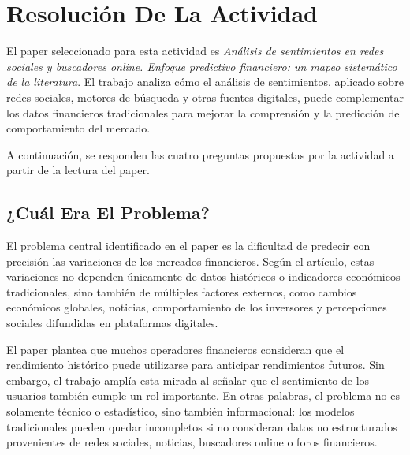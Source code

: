 
\section{Resolución De La Actividad}
\vspace{2mm}

El paper seleccionado para esta actividad es \textit{Análisis de sentimientos en redes sociales y buscadores online. Enfoque predictivo financiero: un mapeo sistemático de la literatura}. El trabajo analiza cómo el análisis de sentimientos, aplicado sobre redes sociales, motores de búsqueda y otras fuentes digitales, puede complementar los datos financieros tradicionales para mejorar la comprensión y la predicción del comportamiento del mercado.

\vspace{2mm}

A continuación, se responden las cuatro preguntas propuestas por la actividad a partir de la lectura del paper.


\subsection{¿Cuál Era El Problema?}
\vspace{2mm}

El problema central identificado en el paper es la dificultad de predecir con precisión las variaciones de los mercados financieros. Según el artículo, estas variaciones no dependen únicamente de datos históricos o indicadores económicos tradicionales, sino también de múltiples factores externos, como cambios económicos globales, noticias, comportamiento de los inversores y percepciones sociales difundidas en plataformas digitales.

\vspace{2mm}

El paper plantea que muchos operadores financieros consideran que el rendimiento histórico puede utilizarse para anticipar rendimientos futuros. Sin embargo, el trabajo amplía esta mirada al señalar que el sentimiento de los usuarios también cumple un rol importante. En otras palabras, el problema no es solamente técnico o estadístico, sino también informacional: los modelos tradicionales pueden quedar incompletos si no consideran datos no estructurados provenientes de redes sociales, noticias, buscadores online o foros financieros.

